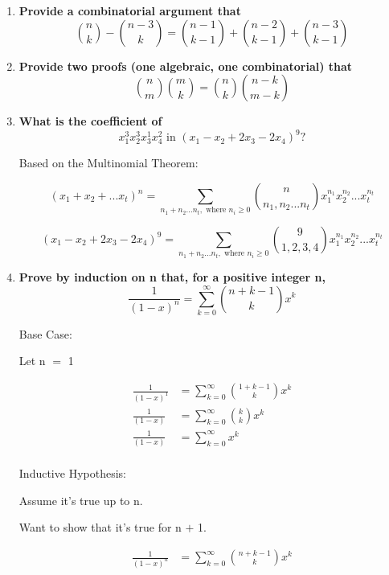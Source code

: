 \documentclass{article}
\newcommand{\mt}[1]{\ensuremath{#1}}
\newcommand{\ps}{\mt{+} }
\newcommand{\gre}{\mt{\geq} }
\newcommand{\eql}{\mt{=} }
\newcommand{\nck}[2]{\mt{{#1 \choose #2}}}
\newcommand{\eqn}[1]{\[#1\]}
\newcommand{\splt}[1]{\begin{split}#1\end{split}}
\newcommand{\smm}[2]{ \mt{\sum_{#1}^{#2}}}
\begin{document}
\begin{enumerate}
  \item \textbf{Provide a combinatorial argument that}
  \eqn{\nck{n}{k} - \nck{n - 3}{k} = \nck{n - 1}{k - 1} + \nck{n - 2}{k - 1} \ps \nck{n - 3}{k - 1}}
  \item \textbf{Provide two proofs (one algebraic, one combinatorial) that}
  \eqn{\nck{n}{m} \nck{m}{k} = \nck{n}{k} \nck{n - k}{m - k}}
  \item \textbf{What is the coefficient of}
  \eqn{x_1^3x_2^3x_3^1x_4^2 \textrm{ in } (x_1 - x_2 + 2x_3 - 2x_4)^9?}
  
  Based on the Multinomial Theorem:
  
  \eqn{(x_1 + x_2 + ... x_t)^n = \smm{n_1 + n_2 ... n_t, \textrm{ where } n_i \gre 0}{} \nck{n}{n_1, n_2 ... n_t} x_1^{n_1}x_2^{n_2}...x_t^{n_t}}
  
  \eqn{(x_1 - x_2 + 2x_3 - 2x_4)^9 = \smm{n_1 + n_2 ... n_t, \textrm{ where } n_i \gre 0}{} \nck{9}{1, 2, 3, 4} x_1^{n_1}x_2^{n_2}...x_t^{n_t}}
  
  
  \item \textbf{Prove by induction on n that, for a positive integer n,}
  \eqn{\frac{1}{(1 - x)^n} = \smm{k = 0}{\infty} \nck{n + k - 1}{k}x^k}
  
  Base Case:
  
  Let n \eql 1
  
  \eqn{
  		\splt{
  			\frac{1}{(1 - x)^1} & = \smm{k = 0}{\infty} \nck{1 + k - 1}{k}x^k \\
  			\frac{1}{(1 - x)} & = \smm{k = 0}{\infty} \nck{k}{k}x^k \\
  			\frac{1}{(1 - x)} & = \smm{k = 0}{\infty} x^k \\
  		}
  	}
  
  Inductive Hypothesis:
  
  Assume it's true up to n.
  
  Want to show that it's true for n \ps 1.
  
  \eqn{
  		\splt{
  			\frac{1}{(1 - x)^n} & = \smm{k = 0}{\infty} \nck{n + k - 1}{k}x^k \\
  		}
  	}
  
  
\end{enumerate}
\end{document}
